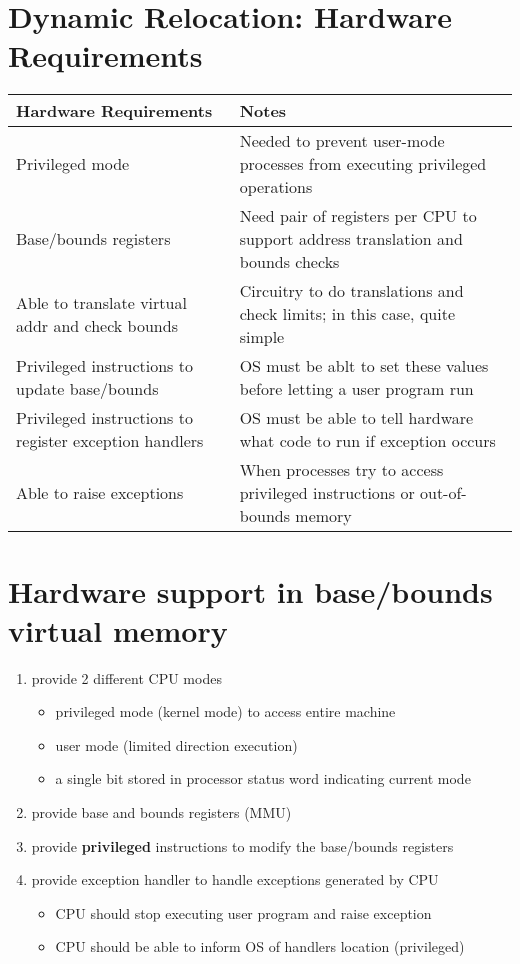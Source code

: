 \section*{Dynamic Relocation: Hardware Requirements}
\begin{tabular}[th!]{p{3.5cm}p{5.4cm}}
  Hardware Requirements & Notes \\
  \hline
  Privileged mode & Needed to prevent user-mode processes from executing privileged operations \\
  \hline
  Base/bounds registers & Need pair of registers per CPU to support address translation and bounds checks \\
  \hline
  Able to translate virtual addr and check bounds & Circuitry to do translations and check limits; in this case, quite simple\\
  \hline
  Privileged instructions to update base/bounds & OS must be ablt to set these values before letting a user program run \\
  \hline
  Privileged instructions to register exception handlers & OS must be able to tell hardware what code to run if exception occurs \\
  \hline
  Able to raise exceptions & When processes try to access privileged instructions or out-of-bounds memory \\
  \hline
\end{tabular}
\section*{Hardware support in base/bounds virtual memory}
\begin{enumerate}
\item provide 2 different CPU modes
  \begin{itemize}
  \item privileged mode (kernel mode) to access entire machine
  \item user mode (limited direction execution)
  \item a single bit stored in processor status word indicating current mode
  \end{itemize}
\item provide base and bounds registers (MMU)
\item provide \textbf{privileged} instructions to modify the base/bounds registers
\item provide exception handler to handle exceptions generated by CPU
  \begin{itemize}
  \item CPU should stop executing user program and raise exception
  \item CPU should be able to inform OS of handlers location (privileged)
  \end{itemize}
\end{enumerate}
